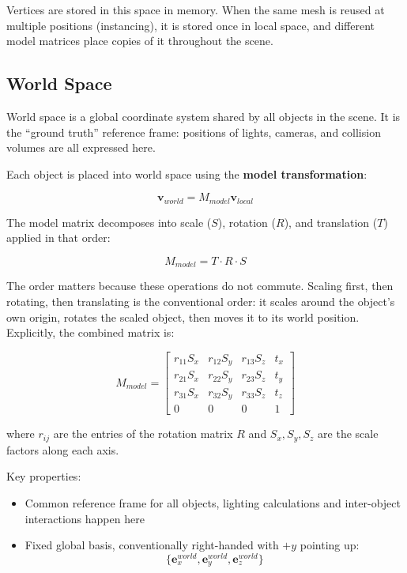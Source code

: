 \documentclass[11pt]{article}
\begin{document}
Vertices are stored in this space in memory. When the same mesh is reused at multiple positions (instancing), it is stored once in local space, and different model matrices place copies of it throughout the scene.

\subsection{World Space}

World space is a global coordinate system shared by all objects in the scene. It is the ``ground truth'' reference frame: positions of lights, cameras, and collision volumes are all expressed here.

Each object is placed into world space using the \textbf{model transformation}:

\begin{equation}
    \mathbf{v}_{world} = M_{model} \mathbf{v}_{local}
\end{equation}

The model matrix decomposes into scale ($S$), rotation ($R$), and translation ($T$) applied in that order:

\begin{equation}
    M_{model} = T \cdot R \cdot S
\end{equation}

The order matters because these operations do not commute. Scaling first, then rotating, then translating is the conventional order: it scales around the object's own origin, rotates the scaled object, then moves it to its world position. Explicitly, the combined matrix is:

\begin{equation}
    M_{model} =
    \begin{bmatrix}
        r_{11}S_x & r_{12}S_y & r_{13}S_z & t_x \\
        r_{21}S_x & r_{22}S_y & r_{23}S_z & t_y \\
        r_{31}S_x & r_{32}S_y & r_{33}S_z & t_z \\
        0 & 0 & 0 & 1
    \end{bmatrix}
\end{equation}

where $r_{ij}$ are the entries of the rotation matrix $R$ and $S_x, S_y, S_z$ are the scale factors along each axis.

Key properties:

\begin{itemize}
    \item Common reference frame for all objects, lighting calculations and inter-object interactions happen here
    \item Fixed global basis, conventionally right-handed with $+y$ pointing up:
    \begin{equation}
        \{\mathbf{e}_x^{world}, \mathbf{e}_y^{world}, \mathbf{e}_z^{world}\}
    \end{equation}
\end{itemize}
\end{document}
